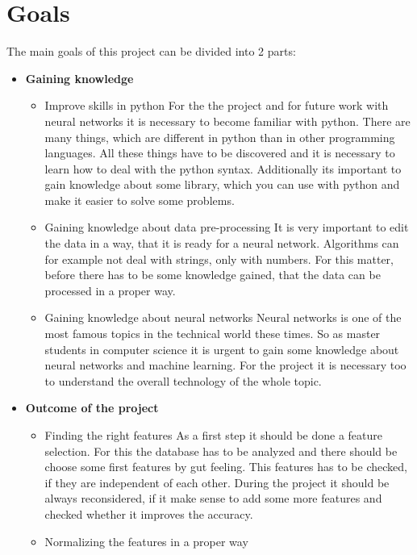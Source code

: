 \section{Goals}
The main goals of this project can be divided into 2 parts:
\begin{itemize}
	\item \textbf{Gaining knowledge}
		\begin{itemize}
			\item Improve skills in python\newline
			For the the project and for future work with neural networks it is necessary to become familiar with python. There are many things, which are different in python than in other programming languages. All these things have to be discovered and it is necessary to learn how to deal with the python syntax. Additionally its important to gain knowledge about some library, which you can use with python and make it easier to solve some problems.
			\item Gaining knowledge about data pre-processing\newline 
			It is very important to edit the data in a way, that it is ready for a neural network. Algorithms can for example not deal with strings, only with numbers. For this matter, before there has to be some knowledge gained, that the data can be processed in a proper way.
			\item Gaining knowledge about neural networks\newline
			Neural networks is one of the most famous topics in the technical world these times. So as master students in computer science it is urgent to gain some knowledge about neural networks and machine learning. For the project it is necessary too to understand the overall technology of the whole topic. 
		\end{itemize}
	\item \textbf{Outcome of the project}
		\begin{itemize}
			\item Finding the right features \newline
			As a first step it should be done a feature selection. For this the database has to be analyzed and there should be choose some first features by gut feeling. This features has to be checked, if they are independent of each other. During the project it should be always reconsidered, if it make sense to add some more features and checked whether it improves the accuracy. 
			\item Normalizing the features in a proper way \newline

\end{itemize}
\end{itemize}
